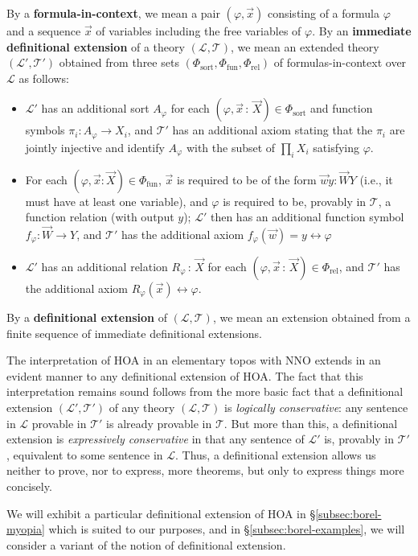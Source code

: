 \documentclass[11pt]{amsart}
\newcommand\cL{\mathcal{L}}
\newcommand\cT{\mathcal{T}}
\newcommand\defword[1]{\textbf{#1}}
\renewcommand\phi{\varphi}
\newcommand\tolon{{\,:\,}}
\newcommand\tot{\leftrightarrow}
\newcommand\vW{\vec{W}}
\newcommand\vw{\vec{w}}
\newcommand\vX{\vec{X}}
\newcommand\vx{\vec{x}}
\theoremstyle{definition}
\theoremstyle{remark}
\theoremstyle{plain}
\begin{document}
\begin{enumerate}[1.]
  By a \defword{formula-in-context}, we mean a pair \( (\phi, \vx) \) consisting of a formula \( \phi \) and a sequence \( \vx \) of variables including the free variables of \( \phi \).
  By an \defword{immediate definitional extension} of a theory \( (\cL, \cT) \), we mean an extended theory \( (\cL', \cT') \) obtained from three sets \( (\Phi_{\mathrm{sort}}, \Phi_{\mathrm{fun}}, \Phi_{\mathrm{rel}})  \) of formulas-in-context over \( \cL \) as follows:
  \begin{itemize}
  \item \( \cL' \) has an additional sort \( A_\phi \) for each \( (\phi, \vx \tolon \vX) \in \Phi_{\mathrm{sort}} \) and function symbols \( \pi_i \colon A_{\phi} \to X_i \), and \( \cT' \) has an additional axiom stating that the \( \pi_i \) are jointly injective and identify \( A_{\phi} \) with the subset of \( \prod_{i} X_i \) satisfying \( \phi \).
  \item For each \( (\phi, \vx \colon \vX) \in \Phi_{\mathrm{fun}} \), \( \vx \) is required to be of the form \( \vw y \colon \vW Y \) (i.e., it must have at least one variable), and \( \phi \) is required to be, provably in \( \cT \), a function relation (with output \( y \)); \( \cL' \) then has an additional function symbol \( f_\phi \colon \vW \to Y \), and \( \cT' \) has the additional axiom \( f_\phi(\vw) = y \tot \phi \)
  \item \( \cL' \) has an additional relation \( R_\phi \tolon \vX \) for each \( (\phi, \vx \tolon \vX) \in \Phi_{\mathrm{rel}} \), and \( \cT' \) has the additional axiom \( R_\phi(\vx) \tot \phi \).
  \end{itemize}
  By a \defword{definitional extension} of \( (\cL, \cT) \), we mean an extension obtained from a finite sequence of immediate definitional extensions.

  The interpretation of HOA in an elementary topos with NNO extends in an evident manner to any definitional extension of HOA.
  The fact that this interpretation remains sound follows from the more basic fact that a definitional extension \( (\cL', \cT')  \) of any theory \( (\cL, \cT) \) is \emph{logically conservative}: any sentence in \( \cL \) provable in \( \cT' \) is already provable in \( \cT \).
  But more than this, a definitional extension is \emph{expressively conservative} in that any sentence of \( \cL' \) is, provably in \( \cT' \), equivalent to some sentence in \( \cL \).
  Thus, a definitional extension allows us neither to prove, nor to express, more theorems, but only to express things more concisely.

  We will exhibit a particular definitional extension of HOA in \S\ref{subsec:borel-myopia} which is suited to our purposes, and in \S\ref{subsec:borel-examples}, we will consider a variant of the notion of definitional extension.
\end{enumerate}
\end{document}
